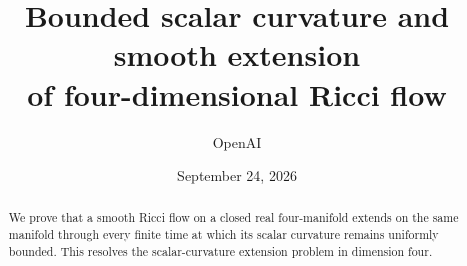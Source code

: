 \documentclass[11pt]{article}
\title{Bounded scalar curvature and smooth extension\\
       of four-dimensional Ricci flow}
\author{OpenAI}
\date{September 24, 2026}
\begin{document}
\maketitle
\begin{abstract}
We prove that a smooth Ricci flow on a closed real four-manifold extends on
the same manifold through every finite time at which its scalar curvature
remains uniformly bounded. This resolves the scalar-curvature extension
problem in dimension four.
\end{abstract}
\tableofcontents










\end{document}
